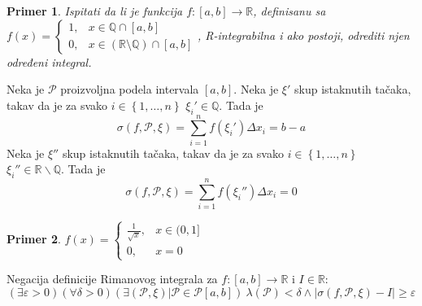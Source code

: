 \documentclass{article}
\newtheorem{prim}{Primer}[section]
\begin{document}
\begin{primbox}
    \label{primer_2.2}
    \begin{prim}
        Ispitati da li je funkcija $f: \left[a,b\right]\longrightarrow\mathbb{R}$, definisanu sa $f\left(x\right)=
            \begin{cases}
                1, & x \in \mathbb{Q} \cap \left[a,b\right]                                   \\
                0, & x \in \left(\mathbb{R} \setminus \mathbb{Q}\right) \cap \left[a,b\right]
            \end{cases}$, R-integrabilna i ako postoji, odrediti njen određeni integral.
    \end{prim}
    Neka je $\mathcal{P}$ proizvoljna podela intervala $\left[a,b\right]$. Neka je $\xi'$ skup
    istaknutih tačaka, takav da je za svako $i\in\left\{1,\dotsc,n\right\}$ $\xi_i'\in\mathbb{Q}$.
    Tada je
    \begin{equation}
        \label{primer_2.2:eq1}
        \sigma\left(f,\mathcal{P},\xi\right)=\sum_{i=1}^{n}f\left(\xi_i'\right)\Delta x_i=b-a
    \end{equation}
    Neka je $\xi''$ skup istaknutih tačaka, takav da je za svako $i\in\left\{1,\dotsc,n\right\}$ $\xi_i''\in\mathbb{R}\backslash\mathbb{Q}$.
    Tada je
    \begin{equation}
        \label{primer_2.2:eq2}
        \sigma\left(f,\mathcal{P},\xi\right)=\sum_{i=1}^{n}f\left(\xi_i''\right)\Delta x_i=0
    \end{equation}

\end{primbox}
\begin{primbox}
    \label{primer_2.3}
    \begin{prim}
        $f\left(x\right)=
            \begin{cases}
                \frac{1}{\sqrt{x}}, & x \in (0,1] \\
                0,                  & x =0
            \end{cases}$
    \end{prim}
    Negacija definicije Rimanovog integrala za $f:\left[a,b\right]\longrightarrow\mathbb{R}$ i $I\in\mathbb{R}$:
    $$\left(\exists\varepsilon>0\right)\left(\forall\delta>0\right)\left(\exists\left(\mathcal{P},\xi\right)\big|\mathcal{P}\in\mathcal{P}\left[a,b\right]\right)\ \lambda\left(\mathcal{P}\right)<\delta\land|\sigma\left(f,\mathcal{P},\xi\right)-I|\geq\varepsilon$$
\end{primbox}
\end{document}
